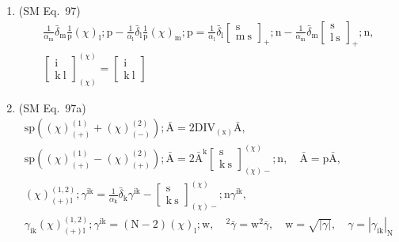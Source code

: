 \documentclass[12pt]{article}
\begin{document}
\begin{enumerate}[label=(\arabic*), series=formellist]
    \item (SM Eq.\ 97) 
    \[
    \begin{gathered}
    \frac{1}{\alpha_\mathrm{m}}\bar{\delta}_\mathrm{m} \frac{1}{\mathrm{p}}(\chi)_\mathrm{l};\mathrm{p} - \frac{1}{\alpha_\mathrm{l}}\bar{\delta}_\mathrm{l} \frac{1}{\mathrm{p}}(\chi)_\mathrm{m};\mathrm{p} = \frac{1}{\alpha_\mathrm{l}}\bar{\delta}_\mathrm{l} \left[ \begin{smallmatrix} \mathrm{s} \\ \mathrm{m}\ \mathrm{s} \end{smallmatrix} \right]_+;\mathrm{n} - \frac{1}{\alpha_\mathrm{m}}\bar{\delta}_\mathrm{m} \left[ \begin{smallmatrix} \mathrm{s} \\ \mathrm{l}\ \mathrm{s} \end{smallmatrix} \right]_+;\mathrm{n}, \\
    \left[ \begin{smallmatrix} \mathrm{i} \\ \mathrm{k}\ \mathrm{l} \end{smallmatrix} \right]^{(\chi)}_{(\chi)} = \left[ \begin{smallmatrix} \mathrm{i} \\ \mathrm{k}\ \mathrm{l} \end{smallmatrix} \right]
    \end{gathered}
    \]

    \item (SM Eq.\ 97a) 
    \[
    \begin{gathered}
    \mathrm{sp}\left((\chi)^{(1)}_{(+)} + (\chi)^{(2)}_{(-)}\right); \bar{\mathrm{A}} = 2\mathrm{DIV}_{(\mathrm{x})}\bar{\mathrm{A}}, \\
    \mathrm{sp}\left((\chi)^{(1)}_{(+)} - (\chi)^{(2)}_{(+)}\right); \bar{\mathrm{A}} = 2\bar{\mathrm{A}}^\mathrm{k} \left[ \begin{smallmatrix} \mathrm{s} \\ \mathrm{k\ s} \end{smallmatrix} \right]^{(\chi)}_{(\chi)-}; \mathrm{n}, \quad \bar{\mathrm{A}} = \mathrm{p}\bar{\mathrm{A}}, \\
    (\chi)^{(1,2)}_{(+)\mathrm{l}} ; \gamma^{\mathrm{ik}} = \frac{1}{\alpha_\mathrm{k}}\bar{\delta}_\mathrm{k} \gamma^{\mathrm{ik}} - \left[ \begin{smallmatrix} \mathrm{s} \\ \mathrm{k\ s} \end{smallmatrix} \right]^{(\chi)}_{(\chi)-}; \mathrm{n} \gamma^{\mathrm{ik}}, \\
    \gamma_{\mathrm{ik}}(\chi)^{(1,2)}_{(+)\mathrm{l}} ; \gamma^{\mathrm{ik}} = (\mathrm{N}-2)(\chi)_\mathrm{l} ; \mathrm{w}, \quad {}^2\bar{\gamma} = \mathrm{w}^2 \bar{\gamma}, \quad \mathrm{w} = \sqrt{|\gamma|}, \quad \gamma = |\gamma_{\mathrm{ik}}|_\mathrm{N}
    \end{gathered}
    \]


\end{enumerate}
\end{document}
